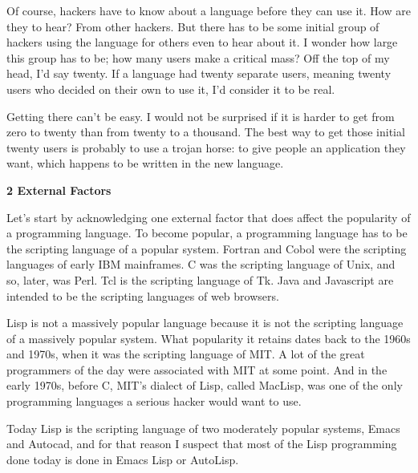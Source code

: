 Of course, hackers have to
                  know about a language before they can use it. How are they to
                  hear? From other hackers. But there has to be some initial
                  group of hackers using the language for others even to hear
                  about it. I wonder how large this group has to be; how many
                  users make a critical mass? Off the top of my head, I'd say
                  twenty. If a language had twenty separate users, meaning
                  twenty users who decided on their own to use it, I'd consider
                  it to be real.

Getting there can't be easy. I would
                  not be surprised if it is harder to get from zero to twenty
                  than from twenty to a thousand. The best way to get those
                  initial twenty users is probably to use a trojan horse: to
                  give people an application they want, which happens to be
                  written in the new language.

\textbf{2 External Factors}

Let's start by acknowledging one external factor
                  that does affect the popularity of a programming language. To
                  become popular, a programming language has to be the scripting
                  language of a popular system. Fortran and Cobol were the
                  scripting languages of early IBM mainframes. C was the
                  scripting language of Unix, and so, later, was Perl. Tcl is
                  the scripting language of Tk. Java and Javascript are intended
                  to be the scripting languages of web browsers.

Lisp
                  is not a massively popular language because it is not the
                  scripting language of a massively popular system. What
                  popularity it retains dates back to the 1960s and 1970s, when
                  it was the scripting language of MIT. A lot of the great
                  programmers of the day were associated with MIT at some point.
                  And in the early 1970s, before C, MIT's dialect of Lisp,
                  called MacLisp, was one of the only programming languages a
                  serious hacker would want to use.

Today Lisp is the
                  scripting language of two moderately popular systems, Emacs
                  and Autocad, and for that reason I suspect that most of the
                  Lisp programming done today is done in Emacs Lisp or
                  AutoLisp.

